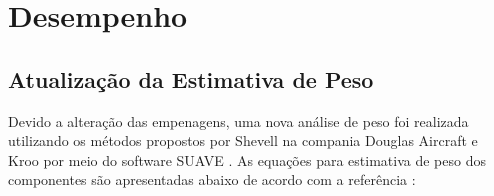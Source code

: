 \chapter{Desempenho}

\section{Atualização da Estimativa de Peso}

Devido a alteração das empenagens, uma nova análise de peso foi realizada utilizando os métodos propostos por Shevell \cite{shevell1989fundamentals} na compania Douglas Aircraft e Kroo \cite{kroo_shevell} por meio do software SUAVE \cite{lukaczyk2015suave,SUAVE}. As equações para estimativa de peso dos componentes são apresentadas abaixo de acordo com a referência \cite{lukaczyk2015suave}:

